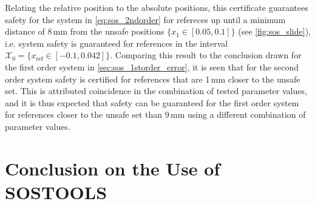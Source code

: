 Relating the relative position to the absolute positions, this certificate guarantees safety for the system in \autoref{eq:sos_2ndorder} for refereces up until a minimum distance of 8\,mm from the unsafe positions $\{x_1\in[0.05,0.1] \}$ (see \autoref{fig:sos_slide}), i.e. system safety is guaranteed for references in the interval $\mathcal{X}_0=\{x_\text{ref}\in[-0.1,0.042] \}$. Comparing this result to the conclusion drawn for the first order system in \autoref{sec:sos_1storder_error}, it is seen that for the second order system safety is certified for references that are 1\,mm closer to the unsafe set. This is attributed coincidence in the combination of tested parameter values, and it is thus expected that safety can be guaranteed for the first order system for references closer to the unsafe set than 9\,mm using a different combination of parameter values.



\section{Conclusion on the Use of SOSTOOLS}\label{sec:sos_conclusion}
